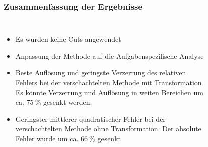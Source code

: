 \documentclass[aspectratio=1610, professionalfonts, 9pt]{beamer}
\begin{document}
  \begin{frame}
    \frametitle{Zusammenfassung der Ergebnisse}
    \begin{columns}
      \begin{itemize}
        \item Es wurden keine Cuts angewendet
        \item Anpassung der Methode auf die Aufgabenspezifische Analyse
        \item Beste Auflösung und geringste Verzerrung des relativen Fehlers bei der verschachtelten Methode mit Transformation
              Es könnte Verzerrung und Auflösung in weiten Bereichen um ca. $\SI{75}{\percent}$ gesenkt werden.
        \item Geringster mittlerer quadratischer Fehler bei der verschachtelten Methode ohne Transformation.
              Der absolute Fehler wurde um ca. $\SI{66}{\percent}$ gesenkt
      \end{itemize}
      \begin{figure}
        \centering
        \parbox{0.49\textwidth}{%

          }


\end{figure}
\end{columns}
\end{frame}
\end{document}
